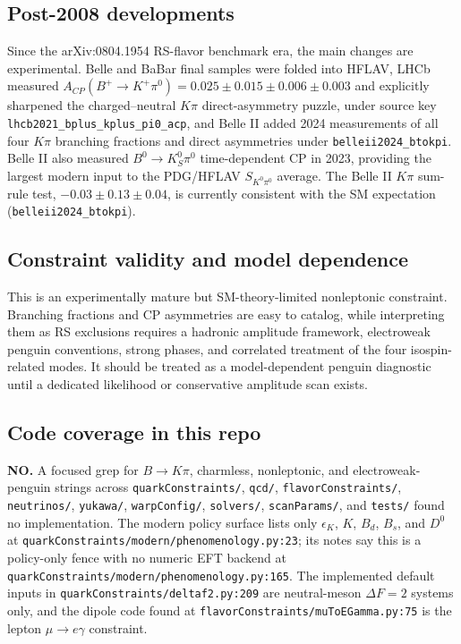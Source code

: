 \subsection*{Post-2008 developments}
Since the arXiv:0804.1954 RS-flavor benchmark era, the main changes are
experimental.  Belle and BaBar final samples were folded into HFLAV, LHCb
measured \(A_{CP}(B^+\to K^+\pi^0)=0.025\pm0.015\pm0.006\pm0.003\) and
explicitly sharpened the charged--neutral \(K\pi\) direct-asymmetry puzzle,
under source key \texttt{lhcb2021\_bplus\_kplus\_pi0\_acp}, and Belle II
added 2024 measurements of all four \(K\pi\) branching fractions and direct
asymmetries under \texttt{belleii2024\_btokpi}.  Belle II also measured
\(B^0\to K_S^0\pi^0\)
time-dependent CP in 2023, providing the largest modern input to the
PDG/HFLAV \(S_{K^0\pi^0}\) average.  The Belle II \(K\pi\) sum-rule test,
\(-0.03\pm0.13\pm0.04\), is currently consistent with the SM expectation
(\texttt{belleii2024\_btokpi}).

\subsection*{Constraint validity and model dependence}
This is an experimentally mature but SM-theory-limited nonleptonic constraint.
Branching fractions and CP asymmetries are easy to catalog, while interpreting
them as RS exclusions requires a hadronic amplitude framework, electroweak
penguin conventions, strong phases, and correlated treatment of the four
isospin-related modes.  It should be treated as a model-dependent penguin
diagnostic until a dedicated likelihood or conservative amplitude scan exists.

\subsection*{Code coverage in this repo}
\textbf{NO.}  A focused grep for \(B\to K\pi\), charmless, nonleptonic, and
electroweak-penguin strings across \texttt{quarkConstraints/}, \texttt{qcd/},
\texttt{flavorConstraints/}, \texttt{neutrinos/}, \texttt{yukawa/},
\texttt{warpConfig/}, \texttt{solvers/}, \texttt{scanParams/}, and
\texttt{tests/} found no implementation.  The modern policy surface lists only
\(\epsilon_K\), \(K\), \(B_d\), \(B_s\), and \(D^0\) at
\texttt{quarkConstraints/modern/phenomenology.py:23}; its notes say this is a
policy-only fence with no numeric EFT backend at
\texttt{quarkConstraints/modern/phenomenology.py:165}.  The implemented
default inputs in \texttt{quarkConstraints/deltaf2.py:209} are neutral-meson
\(\Delta F=2\) systems only, and the dipole code found at
\texttt{flavorConstraints/muToEGamma.py:75} is the lepton \(\mu\to e\gamma\)
constraint.


